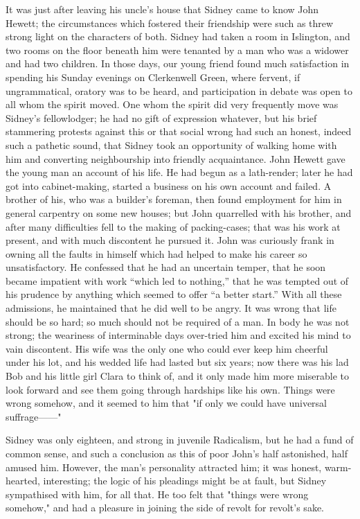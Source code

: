 It was just after leaving his uncle's house that Sidney came to know
John Hewett; the circumstances which fostered their friendship were such
as threw strong light on the characters of both. Sidney had taken a room
in Islington, and two rooms on the floor beneath him were tenanted by a
man who was a widower and had two children. In those days, our young
friend found much satisfaction in spending his Sunday evenings on
Clerkenwell Green, where fervent, if ungrammatical, oratory was to be
heard, and participation in debate was open to all whom the spirit
moved. One whom the spirit did very frequently move was Sidney's
fellowlodger; he had no gift of expression {}whatever, but his brief
stammering protests against this or that social wrong had such an
honest, indeed such a pathetic sound, that Sidney took an opportunity of
walking home with him and converting neighbourship into friendly
acquaintance. John Hewett gave the young man an account of his life. He
had begun as a lath-render; later he had got into cabinet-making,
started a business on his own account and failed. A brother of his, who
was a builder's foreman, then found employment for him in general
carpentry on some new houses; but John quarrelled with his brother, and
after many difficulties fell to the making of packing-cases; that was
his work at present, and with much discontent he pursued it. John was
curiously frank in owning all the faults in himself which had helped to
make his career so unsatisfactory. He confessed that he had an uncertain
temper, that he soon became impatient with work ``which led to
nothing,'' that he was tempted out of his prudence by anything which
seemed to offer ``a better start.'' With all these admissions, he
{}maintained that he did well to be angry. It was wrong that life should
be so hard; so much should not be required of a man. In body he was not
strong; the weariness of interminable days over-tried him and excited
his mind to vain discontent. His wife was the only one who could ever
keep him cheerful under his lot, and his wedded life had lasted but six
years; now there was his lad Bob and his little girl Clara to think of,
and it only made him more miserable to look forward and see them going
through hardships like his own. Things were wrong somehow, and it seemed
to him that "if only we could have universal suffrage{{------}}"

Sidney was only eighteen, and strong in juvenile Radicalism, but he had
a fund of common sense, and such a conclusion as this of poor John's
half astonished, half amused him. However, the man's personality
attracted him; it was honest, warm-hearted, interesting; the logic of
his pleadings might be at fault, but Sidney sympathised with him, for
all that. He too felt that "things were {}wrong somehow," and had a
pleasure in joining the side of revolt for revolt's sake.

